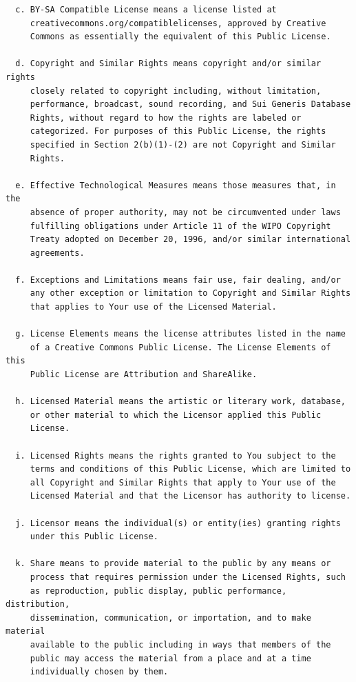 \documentclass[12pt,spanish,]{article}
\begin{document}
\begin{verbatim}
  c. BY-SA Compatible License means a license listed at
     creativecommons.org/compatiblelicenses, approved by Creative
     Commons as essentially the equivalent of this Public License.

  d. Copyright and Similar Rights means copyright and/or similar rights
     closely related to copyright including, without limitation,
     performance, broadcast, sound recording, and Sui Generis Database
     Rights, without regard to how the rights are labeled or
     categorized. For purposes of this Public License, the rights
     specified in Section 2(b)(1)-(2) are not Copyright and Similar
     Rights.

  e. Effective Technological Measures means those measures that, in the
     absence of proper authority, may not be circumvented under laws
     fulfilling obligations under Article 11 of the WIPO Copyright
     Treaty adopted on December 20, 1996, and/or similar international
     agreements.

  f. Exceptions and Limitations means fair use, fair dealing, and/or
     any other exception or limitation to Copyright and Similar Rights
     that applies to Your use of the Licensed Material.

  g. License Elements means the license attributes listed in the name
     of a Creative Commons Public License. The License Elements of this
     Public License are Attribution and ShareAlike.

  h. Licensed Material means the artistic or literary work, database,
     or other material to which the Licensor applied this Public
     License.

  i. Licensed Rights means the rights granted to You subject to the
     terms and conditions of this Public License, which are limited to
     all Copyright and Similar Rights that apply to Your use of the
     Licensed Material and that the Licensor has authority to license.

  j. Licensor means the individual(s) or entity(ies) granting rights
     under this Public License.

  k. Share means to provide material to the public by any means or
     process that requires permission under the Licensed Rights, such
     as reproduction, public display, public performance, distribution,
     dissemination, communication, or importation, and to make material
     available to the public including in ways that members of the
     public may access the material from a place and at a time
     individually chosen by them.


\end{verbatim}
\end{document}
